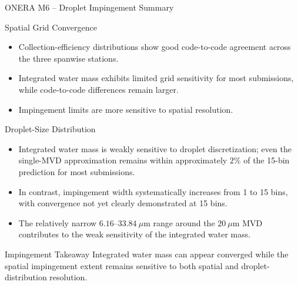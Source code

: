 \begin{frame}{\small ONERA M6 -- Droplet Impingement Summary}
\scriptsize

\begin{block}{\scriptsize Spatial Grid Convergence}
\begin{itemize}
    \item Collection-efficiency distributions show good code-to-code agreement across the three spanwise stations.
    \item Integrated water mass exhibits limited grid sensitivity for most submissions, while code-to-code differences remain larger.
    \item Impingement limits are more sensitive to spatial resolution.
\end{itemize}
\end{block}

\vspace{0.15cm}

\begin{block}{\scriptsize Droplet-Size Distribution}
\begin{itemize}
    \item Integrated water mass is weakly sensitive to droplet discretization; even the single-MVD approximation remains within approximately $2\%$ of the 15-bin prediction for most submissions.
    \item In contrast, impingement width systematically increases from 1 to 15 bins, with convergence not yet clearly demonstrated at 15 bins.
    \item The relatively narrow $6.16$--$33.84~\mu$m range around the $20~\mu$m MVD contributes to the weak sensitivity of the integrated water mass.
\end{itemize}
\end{block}

\vspace{0.15cm}

\begin{alertblock}{\scriptsize Impingement Takeaway}
Integrated water mass can appear converged while the spatial impingement extent remains sensitive to both spatial and droplet-distribution resolution.
\end{alertblock}

\end{frame}
